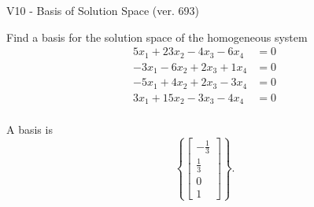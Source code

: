 \begin{exercise}
  \begin{exerciseTitle}V10 - Basis of Solution Space (ver. 693)\end{exerciseTitle}
  \begin{exerciseStatement}
    Find a basis for the solution space of the homogeneous system 
\begin{align*}
 5 x_ 1 + 23 x_ 2 -4 x_ 3 -6 x_ 4 &= 0  \\ 
  -3 x_ 1 -6 x_ 2 + 2 x_ 3 + 1 x_ 4 &= 0  \\ 
  -5 x_ 1 + 4 x_ 2 + 2 x_ 3 -3 x_ 4 &= 0  \\ 
  3 x_ 1 + 15 x_ 2 -3 x_ 3 -4 x_ 4 &= 0  \\ 
 \end{align*}


 
  \end{exerciseStatement}

  \begin{exerciseAnswer}
   A basis is   
\[\left\{\left[\begin{array}{c}
-\frac{1}{3} \\
\frac{1}{3} \\
0 \\
1
\end{array}\right]\right\}.\]

  


  \end{exerciseAnswer}
\end{exercise}